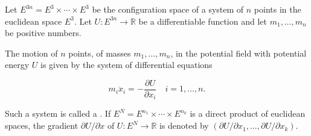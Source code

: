 Let $E^{3n} = E^3 \times \cdots \times E^3$ be the configuration space of a system of $n$ points in the euclidean space $E^3$. Let $U: E^{3n} \rightarrow \mathbb{R}$ be a differentiable function and let $m_1, \ldots, m_n$ be positive numbers.

The motion of $n$ points, of masses $m_1, \ldots, m_n$, in the potential field with potential energy $U$ is given by the system of differential equations

$$m_i \ddot{x}_i = -\frac{\partial U}{\partial x_i} \quad i = 1, \ldots, n.$$

Such a system is called a . If $E^N = E^{n_1} \times \cdots \times E^{n_k}$ is a direct product of euclidean spaces, the gradient $\partial U/\partial x$ of $U: E^N \rightarrow \mathbb{R}$ is denoted by $(\partial U/\partial x_1, \ldots, \partial U/\partial x_k)$.
